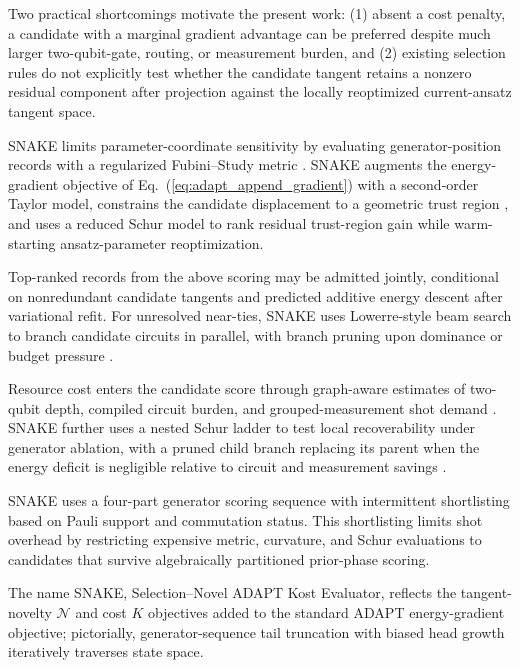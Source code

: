 \documentclass[
  reprint,
  amsmath,
  amssymb,
  aps,
  pra,
  nofootinbib,
  superscriptaddress,
  floatfix
]{revtex4-2}
\begin{document}
Two practical shortcomings motivate the present work: (1) absent a cost penalty, a candidate with a marginal gradient advantage can be preferred despite much larger two-qubit-gate, routing, or measurement burden, and (2) existing selection rules do not explicitly test whether the candidate tangent retains a nonzero residual component after projection against the locally reoptimized current-ansatz tangent space.


SNAKE limits parameter-coordinate sensitivity by evaluating generator-position records with a regularized Fubini--Study metric \cite{Sohail2026GeoADAPT}. SNAKE augments the energy-gradient objective of Eq.~(\ref{eq:adapt_append_gradient}) with a second-order Taylor model, constrains the candidate displacement to a geometric trust region \cite{Nocedal2006TrustRegion}, and uses a reduced Schur model to rank residual trust-region gain while warm-starting ansatz-parameter reoptimization.

Top-ranked records from the above scoring may be admitted jointly, conditional on nonredundant candidate tangents and predicted additive energy descent after variational refit. For unresolved near-ties, SNAKE uses Lowerre-style beam search to branch candidate circuits in parallel, with branch pruning upon dominance or budget pressure \cite{Lowerre1976Beam}.

Resource cost enters the candidate score through graph-aware estimates of two-qubit depth, compiled circuit burden, and grouped-measurement shot demand \cite{Verteletskyi2020CliqueCover,Yen2020CompatibleMeasurements,Ikhtiarudin2025ShotEfficient}. SNAKE further uses a nested Schur ladder to test local recoverability under generator ablation, with a pruned child branch replacing its parent when the energy deficit is negligible relative to circuit and measurement savings \cite{Vaquero2025PrunedADAPT}.

SNAKE uses a four-part generator scoring sequence with intermittent shortlisting based on Pauli support and commutation status. This shortlisting limits shot overhead by restricting expensive metric, curvature, and Schur evaluations to candidates that survive algebraically partitioned prior-phase scoring.

The name SNAKE, Selection--Novel ADAPT Kost Evaluator, reflects the tangent-novelty \(\mathcal N\) and cost \(K\) objectives added to the standard ADAPT energy-gradient objective; pictorially, generator-sequence tail truncation with biased head growth iteratively traverses state space.
\end{document}
